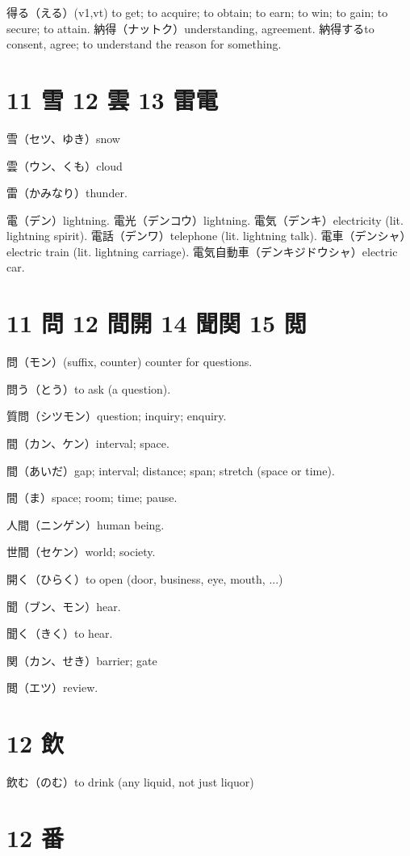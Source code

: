 得る（える）(v1,vt) to get; to acquire; to obtain; to earn; to win; to gain; to secure; to attain.
納得（ナットク）understanding, agreement.
納得するto consent, agree; to understand the reason for something.

\section{11 雪 12 雲 13 雷電}

雪（セツ、ゆき）snow

雲（ウン、くも）cloud

雷（かみなり）thunder.

電（デン）lightning.
電光（デンコウ）lightning.
電気（デンキ）electricity (lit. lightning spirit).
電話（デンワ）telephone (lit. lightning talk).
電車（デンシャ）electric train (lit. lightning carriage).
電気自動車（デンキジドウシャ）electric car.

\section{11 問 12 間開 14 聞関 15 閲}

問（モン）(suffix, counter) counter for questions.

問う（とう）to ask (a question).

質問（シツモン）question; inquiry; enquiry.

間（カン、ケン）interval; space.

間（あいだ）gap; interval; distance; span; stretch (space or time).

間（ま）space; room; time; pause.

人間（ニンゲン）human being.

世間（セケン）world; society.

開く（ひらく）to open (door, business, eye, mouth, ...)

聞（ブン、モン）hear.

聞く（きく）to hear.

関（カン、せき）barrier; gate

閲（エツ）review.

\section{12 飲}

飲む（のむ）to drink (any liquid, not just liquor)

\section{12 番}

